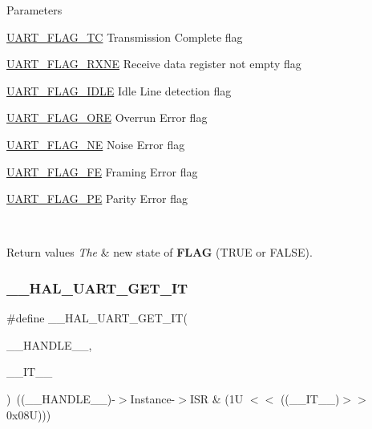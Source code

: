 \begin{DoxyParams}{Parameters}
\begin{DoxyItemize}
\hyperlink{group___u_a_r_t___flags_ga82e68a0ee4a8b987a47c66fc6f744894}{U\+A\+R\+T\+\_\+\+F\+L\+A\+G\+\_\+\+TC} Transmission Complete flag \item \hyperlink{group___u_a_r_t___flags_ga9d1b2860d84a87abb05c3b2fed3c108c}{U\+A\+R\+T\+\_\+\+F\+L\+A\+G\+\_\+\+R\+X\+NE} Receive data register not empty flag \item \hyperlink{group___u_a_r_t___flags_ga5d7a320c505672f7508e3bd99f532a69}{U\+A\+R\+T\+\_\+\+F\+L\+A\+G\+\_\+\+I\+D\+LE} Idle Line detection flag \item \hyperlink{group___u_a_r_t___flags_ga335a5b0f61512223bbc406b38c95b2d6}{U\+A\+R\+T\+\_\+\+F\+L\+A\+G\+\_\+\+O\+RE} Overrun Error flag \item \hyperlink{group___u_a_r_t___flags_ga665981434d02ff5296361782c1a7d4b5}{U\+A\+R\+T\+\_\+\+F\+L\+A\+G\+\_\+\+NE} Noise Error flag \item \hyperlink{group___u_a_r_t___flags_gafba4891ce21cf5223ca5fede0eac388d}{U\+A\+R\+T\+\_\+\+F\+L\+A\+G\+\_\+\+FE} Framing Error flag \item \hyperlink{group___u_a_r_t___flags_gad5b96f73f6d3a0b58f07e2e9d7bf14d9}{U\+A\+R\+T\+\_\+\+F\+L\+A\+G\+\_\+\+PE} Parity Error flag \end{DoxyItemize}
\\
\hline
\end{DoxyParams}

\begin{DoxyRetVals}{Return values}
{\em The} & new state of {\bfseries F\+L\+AG} (T\+R\+UE or F\+A\+L\+SE). \\
\hline
\end{DoxyRetVals}
\mbox{\label{group___u_a_r_t___exported___macros_ga39db42da556cc45d0bf2ab80a3894985}} 
\subsubsection{\texorpdfstring{\+\_\+\+\_\+\+H\+A\+L\+\_\+\+U\+A\+R\+T\+\_\+\+G\+E\+T\+\_\+\+IT}{\_\_HAL\_UART\_GET\_IT}}
{\footnotesize\ttfamily \#define \+\_\+\+\_\+\+H\+A\+L\+\_\+\+U\+A\+R\+T\+\_\+\+G\+E\+T\+\_\+\+IT(\begin{DoxyParamCaption}\item[{}]{\+\_\+\+\_\+\+H\+A\+N\+D\+L\+E\+\_\+\+\_\+,  }\item[{}]{\+\_\+\+\_\+\+I\+T\+\_\+\+\_\+ }\end{DoxyParamCaption})~((\+\_\+\+\_\+\+H\+A\+N\+D\+L\+E\+\_\+\+\_\+)-\/$>$Instance-\/$>$I\+SR \& (1\+U $<$$<$ ((\+\_\+\+\_\+\+I\+T\+\_\+\+\_\+)$>$$>$ 0x08\+U)))}



